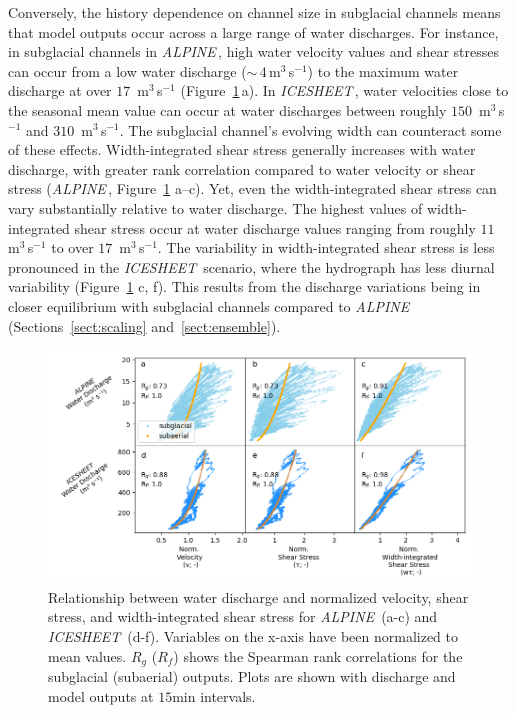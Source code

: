 \documentclass[esurf, manuscript]{copernicus}
\newcommand{\alpine}{\textit{ALPINE}\,}
\newcommand{\icesheet}{\textit{ICESHEET}\,}
\begin{document}
Conversely, the history dependence on channel size in subglacial channels means that model outputs occur across a large range of water discharges.
For instance, in subglacial channels in \alpine{},  high water velocity values and shear stresses can occur from a low water discharge  ($\sim\,4$\,\unit{m}$^3$\,\unit{s}$^{-1}$) to the maximum water discharge at over $17$ \,\unit{m}$^3$\,\unit{s}$^{-1}$ (Figure~\ref{fig:Qw_vari}\,a).
In \icesheet{}, water velocities close to the seasonal mean value can occur at water discharges between roughly $150$ \,\unit{m}$^3$\,\unit{s}$^{-1}$ and $310$ \,\unit{m}$^3$\,\unit{s}$^{-1}$.
The subglacial channel's evolving width can counteract some of these effects.
Width-integrated shear stress generally increases with water discharge, with greater rank correlation compared to water velocity or shear stress (\alpine{}, Figure~\ref{fig:Qw_vari} a--c).
Yet, even the width-integrated shear stress can vary substantially relative to water discharge.
The highest values of width-integrated shear stress occur at water discharge values ranging from roughly $11$ \,\unit{m}$^3$\,\unit{s}$^{-1}$ to over $17$ \,\unit{m}$^3$\,\unit{s}$^{-1}$.
The variability in width-integrated shear stress is less pronounced in the \icesheet{} scenario, where the hydrograph has less diurnal variability (Figure~\ref{fig:Qw_vari} c, f).
This results from the discharge variations being in closer equilibrium with subglacial channels compared to \alpine{} (Sections~\ref{sect:scaling} and~\ref{sect:ensemble}).

\begin{figure}[hbt!]
  \centering
  \includegraphics[width=\linewidth]{Fig6.png}
  \caption{
    Relationship between water discharge and normalized velocity, shear stress, and width-integrated shear stress for \alpine{} (a-c) and \icesheet{} (d-f).
    Variables on the x-axis have been normalized to mean values.
    $R_g$ ($R_f$) shows the Spearman rank correlations for the subglacial (subaerial) outputs.
    Plots are shown with discharge and model outputs at $15$\unit{min} intervals.
  }
  \label{fig:Qw_vari}
\end{figure}
\end{document}
